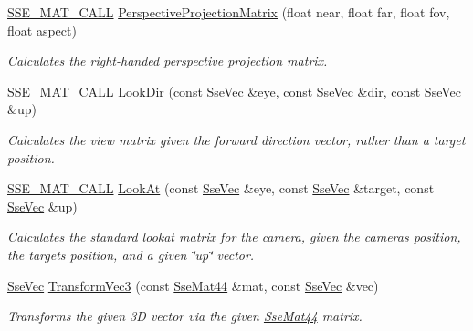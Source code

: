 \begin{DoxyCompactItemize}
\hyperlink{ssemat__math__defs_8h_a741f88d5589197d03fea9ab2b7622b8a}{S\+S\+E\+\_\+\+M\+A\+T\+\_\+\+C\+A\+L\+L} \hyperlink{classgfxmath_1_1_sse_mat44_a701f5bfeb4c0c0d4b080a9ad00f910ce}{Perspective\+Projection\+Matrix} (float near, float far, float fov, float aspect)
\begin{DoxyCompactList}\small\item\em Calculates the right-\/handed perspective projection matrix. \end{DoxyCompactList}\item 
\hyperlink{ssemat__math__defs_8h_a741f88d5589197d03fea9ab2b7622b8a}{S\+S\+E\+\_\+\+M\+A\+T\+\_\+\+C\+A\+L\+L} \hyperlink{classgfxmath_1_1_sse_mat44_a67dc21f3890ac0ef9a36b05b71ad36db}{Look\+Dir} (const \hyperlink{namespacegfxmath_a0de2243e2b8d0fd46d3af5e036423004}{Sse\+Vec} \&eye, const \hyperlink{namespacegfxmath_a0de2243e2b8d0fd46d3af5e036423004}{Sse\+Vec} \&dir, const \hyperlink{namespacegfxmath_a0de2243e2b8d0fd46d3af5e036423004}{Sse\+Vec} \&up)
\begin{DoxyCompactList}\small\item\em Calculates the view matrix given the forward direction vector, rather than a target position. \end{DoxyCompactList}\item 
\hyperlink{ssemat__math__defs_8h_a741f88d5589197d03fea9ab2b7622b8a}{S\+S\+E\+\_\+\+M\+A\+T\+\_\+\+C\+A\+L\+L} \hyperlink{classgfxmath_1_1_sse_mat44_abc7554e34178f4e36a906a12ea469c64}{Look\+At} (const \hyperlink{namespacegfxmath_a0de2243e2b8d0fd46d3af5e036423004}{Sse\+Vec} \&eye, const \hyperlink{namespacegfxmath_a0de2243e2b8d0fd46d3af5e036423004}{Sse\+Vec} \&target, const \hyperlink{namespacegfxmath_a0de2243e2b8d0fd46d3af5e036423004}{Sse\+Vec} \&up)
\begin{DoxyCompactList}\small\item\em Calculates the standard lookat matrix for the camera, given the camera\textquotesingle{}s position, the target\textquotesingle{}s position, and a given \char`\"{}up\char`\"{} vector. \end{DoxyCompactList}\item 
\hyperlink{namespacegfxmath_a0de2243e2b8d0fd46d3af5e036423004}{Sse\+Vec} \hyperlink{classgfxmath_1_1_sse_mat44_a7f0f017f89ae1ba6cf642fba6ce8e4cd}{Transform\+Vec3} (const \hyperlink{classgfxmath_1_1_sse_mat44}{Sse\+Mat44} \&mat, const \hyperlink{namespacegfxmath_a0de2243e2b8d0fd46d3af5e036423004}{Sse\+Vec} \&vec)
\begin{DoxyCompactList}\small\item\em Transforms the given 3\+D vector via the given \hyperlink{classgfxmath_1_1_sse_mat44}{Sse\+Mat44} matrix. \end{DoxyCompactList}\end{DoxyCompactItemize}



